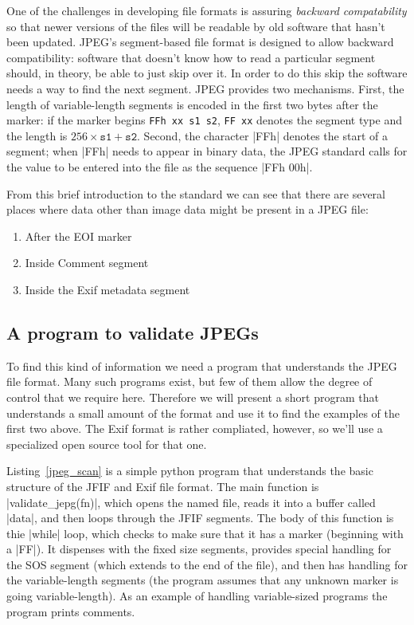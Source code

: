 One of the challenges in developing file formats is assuring
\emph{backward compatability} so that newer versions of the files will
be readable by old software that hasn't been updated. JPEG's
segment-based file format is designed to allow backward compatibility:
software that doesn't know how to read a particular segment should, in
theory, be able to just skip over it. In order to do this skip the
software needs a way to find the next segment. JPEG provides two
mechanisms. First, the length of variable-length segments is encoded
in the first two bytes after the marker: if the marker begins \texttt{FFh xx
  s1 s2}, \texttt{FF xx} denotes the segment type and the length
is $256 \times \texttt{s1} + \texttt{s2}$. Second, the character |FFh|
denotes the start of a segment; when |FFh| needs to appear in binary
data, the JPEG standard calls for the value to be entered into the
file as the sequence |FFh 00h|.

From this brief introduction to the standard we can see that there are  several places where
data other than image data might be present in a JPEG file:

\begin{enumerate}
\item After the EOI marker
\item Inside Comment segment
\item Inside the Exif metadata segment
\end{enumerate}

\subsection{A program to validate JPEGs}

To find this kind of information we need a program that understands
the JPEG file format. Many such programs exist, but few of them allow
the degree of control that we require here. Therefore we will present
a short program that understands a small amount of the format and use
it to find the examples of the first two above. The Exif format is
rather compliated, however, so we'll use a specialized open source
tool for that one.



Listing~\ref{jpeg_scan} is a simple python program that understands
the basic structure of the JFIF and Exif file format. The main
function is |validate_jepg(fn)|, which opens the named file, reads it
into a buffer called |data|, and then loops through the JFIF
segments. The body of this function is thie |while| loop, which checks
to make sure that it has a marker (beginning with a |FF|). It
dispenses with the fixed size segments, provides special handling for
the SOS segment (which extends to the end of the file), and then has
handling for the variable-length segments (the program assumes that
any unknown marker is going variable-length). As an example of
handling variable-sized programs the program prints comments.

